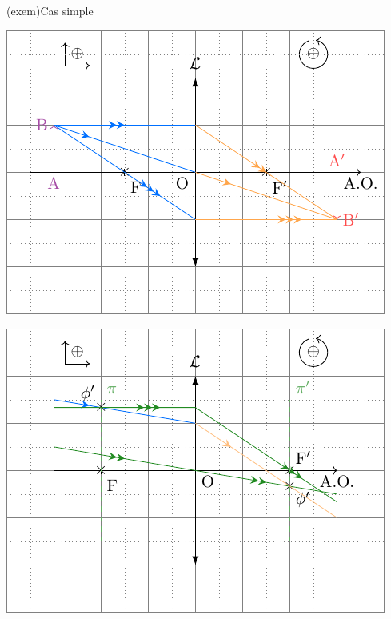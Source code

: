 \documentclass[../../main/main.tex]{subfiles}
\begin{document}
\begin{tcb}[label=exem, sidebyside](exem){Cas simple}
	\begin{center}
		\includegraphics[width=\linewidth]{lent_conv-constru_simple}
		\label{fig:corrconvconstrusimple}
	\end{center}
	\tcblower
	\begin{center}
		\includegraphics[width=\linewidth]{lent_conv-qqe}
		\label{fig:convconstruqqe}
	\end{center}
\end{tcb}
\end{document}

